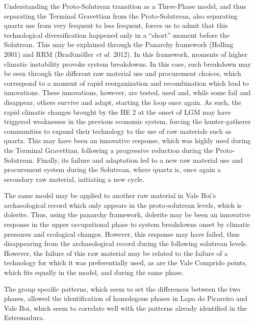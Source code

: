 \documentclass[12pt,twoside]{reedthesis}
\begin{document}
Understanding the Proto-Solutrean transition as a Three-Phase model, and thus separating the Terminal Gravettian from the Proto-Solutrean, also separating quartz use from very frequent to less frequent, forces us to admit that this technological diversification happened only in a ``short'' moment before the Solutrean. This may be explained through the Panarchy framework (Holling 2001) and RRM (Bradtmöller \emph{et al.} 2012). In this framework, moments of higher climatic instability provoke system breakdowns. In this case, such breakdown may be seen through the different raw material use and procurement choices, which correspond to a moment of rapid reorganization and recombination which lead to innovations. These innovations, however, are tested, used and, while some fail and disappear, others survive and adapt, starting the loop once again. As such, the rapid climatic changes brought by the HE 2 at the onset of LGM may have triggered weaknesses in the previous economic system, forcing the hunter-gatherer communities to expand their technology to the use of raw materials such as quartz. This may have been an innovative response, which was highly used during the Terminal Gravettian, following a progressive reduction during the Proto-Solutrean. Finally, its failure and adaptation led to a new raw material use and procurement system during the Solutrean, where quartz is, once again a secondary raw material, initiating a new cycle.

The same model may be applied to another raw material in Vale Boi's archaeological record which only appears in the proto-solutrean levels, which is dolerite. Thus, using the panarchy framework, dolerite may be been an innovative response in the upper occupational phase to system breakdowns onset by climatic pressures and ecological changes. However, this response may have failed, thus disappearing from the archaeological record during the following solutrean levels. However, the failure of this raw material may be related to the failure of a technology for which it was preferentially used, as are the Vale Comprido points, which fits equally in the model, and during the same phase.

The group specific patterns, which seem to set the differences between the two phases, allowed the identification of homologous phases in Lapa do Picareiro and Vale Boi, which seem to correlate well with the patterns already identified in the Estremadura.
\end{document}
